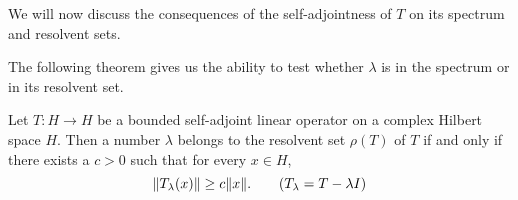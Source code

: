 We will now discuss the consequences of the self-adjointness of \( T  \) on its spectrum and resolvent sets.

The following theorem gives us the ability to test whether \( \lambda    \) is in the spectrum or in its resolvent set. 

\begin{theorem}\label{9.1-2}
    Let \( T: H \to H  \) be a bounded self-adjoint linear operator on a complex Hilbert space \( H \). Then a number \( \lambda  \) belongs to the resolvent set \( \rho(T)  \) of \( T  \) if and only if there exists a \( c > 0  \) such that for every \( x \in H \),
    \[  \|{T}_{\lambda}(x)\| \geq c \|x\|. \tag{\( {T}_{\lambda} = T - \lambda I  \)} \]

\end{theorem}

